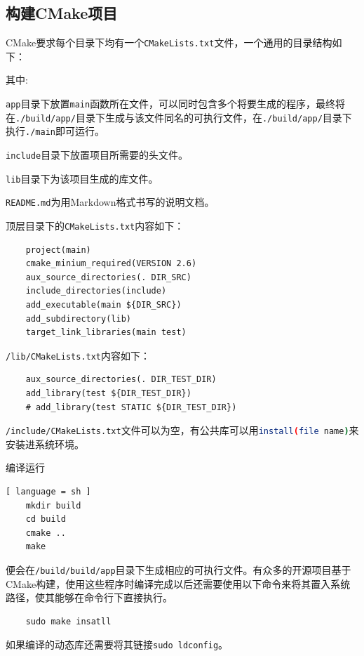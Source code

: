 	\subsection{构建CMake项目}
	\par CMake要求每个目录下均有一个\lstinline{CMakeLists.txt}文件，一个通用的目录结构如下：
	\par\noindent 其中:
	\par\noindent \lstinline{app}目录下放置\lstinline{main}函数所在文件，可以同时包含多个将要生成的程序，最终将在\lstinline{./build/app/}目录下生成与该文件同名的可执行文件，在\lstinline{./build/app/}目录下执行\lstinline{./main}即可运行。
	\par\noindent \lstinline{include}目录下放置项目所需要的头文件。
	\par\noindent \lstinline{lib}目录下为该项目生成的库文件。
	\par\noindent \lstinline{README.md}为用Markdown格式书写的说明文档。
	\par\noindent 顶层目录下的\lstinline{CMakeLists.txt}内容如下：
	\begin{lstlisting}
	project(main)
	cmake_minium_required(VERSION 2.6)
	aux_source_directories(. DIR_SRC)
	include_directories(include)
	add_executable(main ${DIR_SRC})
	add_subdirectory(lib)
	target_link_libraries(main test)
	\end{lstlisting}
	\par\noindent \lstinline{/lib/CMakeLists.txt}内容如下：
	\begin{lstlisting}
	aux_source_directories(. DIR_TEST_DIR)
	add_library(test ${DIR_TEST_DIR})
	# add_library(test STATIC ${DIR_TEST_DIR})
	\end{lstlisting}
	\par\noindent \lstinline{/include/CMakeLists.txt}文件可以为空，有公共库可以用\lstinline[language=sh]{install(file name)}来安装进系统环境。
	\par\noindent 编译运行
	\begin{lstlisting}[ language = sh ]
	mkdir build
	cd build
	cmake ..
	make
	\end{lstlisting}
	\par\noindent 便会在\lstinline{/build/build/app}目录下生成相应的可执行文件。有众多的开源项目基于CMake构建，使用这些程序时编译完成以后还需要使用以下命令来将其置入系统路径，使其能够在命令行下直接执行。
	\begin{lstlisting}
	sudo make insatll
	\end{lstlisting}
	\par\noindent 如果编译的动态库还需要将其链接\lstinline{sudo ldconfig}。
